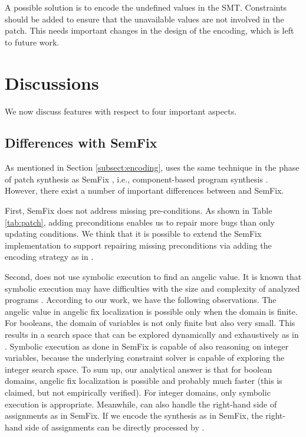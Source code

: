 A possible solution is to encode the undefined values in the SMT. Constraints should be added to ensure that the unavailable values are not involved in the patch. This needs important changes in the design of the encoding, which is left to future work.  

\section{Discussions}
\label{sect:discussions}

We now discuss \nopol features with respect to four important aspects.

\subsection{Differences with SemFix}
\label{subsect:discussion-semfix}

As mentioned in Section \ref{subsect:encoding}, \nopol uses the same technique in the phase of patch synthesis as SemFix \cite{nguyen2013semfix}, i.e., component-based program synthesis \cite{jha2010oracle}. However, there exist a number of important differences between \nopol and SemFix.

First, SemFix does not address missing pre-conditions. As shown in Table \ref{tab:patch}, adding preconditions enables us to repair more bugs than only updating conditions. We think that it is possible to extend the SemFix implementation to support repairing missing preconditions via adding the encoding strategy as in \nopol.

Second, \nopol does not use symbolic execution to find an angelic value. 
It is known that symbolic execution may have difficulties with the size and complexity of analyzed programs \cite{DBLP:journals/tosem/LiCZL14}. According to our work, we have the following observations. The angelic value in angelic fix localization is possible only when the domain is finite. For booleans, the domain of variables is not only finite but also very small. This results in a search space that can be explored dynamically and exhaustively as in \nopol. Symbolic execution as done in SemFix is capable of also reasoning on integer variables, because the underlying constraint solver is capable of exploring the integer search space. To sum up, our analytical answer is that for boolean domains, angelic fix localization is possible and probably much faster (this is claimed, but not empirically verified). For integer domains, only symbolic execution is appropriate. Meanwhile, \nopol can also handle the right-hand side of assignments as in SemFix. If we encode the synthesis as in SemFix, the right-hand side of assignments can be directly processed by \nopol.  

